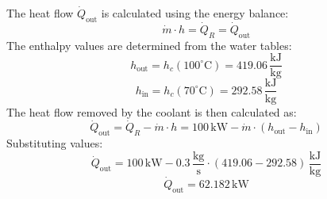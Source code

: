 The heat flow \( \dot{Q}_{\text{out}} \) is calculated using the energy balance:  
\[
\dot{m} \cdot h = \dot{Q}_R = \dot{Q}_{\text{out}}
\]  
The enthalpy values are determined from the water tables:  
\[
h_{\text{out}} = h_c(100^\circ\text{C}) = 419.06 \, \frac{\text{kJ}}{\text{kg}}
\]  
\[
h_{\text{in}} = h_c(70^\circ\text{C}) = 292.58 \, \frac{\text{kJ}}{\text{kg}}
\]  
The heat flow removed by the coolant is then calculated as:  
\[
\dot{Q}_{\text{out}} = \dot{Q}_R - \dot{m} \cdot h = 100 \, \text{kW} - \dot{m} \cdot (h_{\text{out}} - h_{\text{in}})
\]  
Substituting values:  
\[
\dot{Q}_{\text{out}} = 100 \, \text{kW} - 0.3 \, \frac{\text{kg}}{\text{s}} \cdot (419.06 - 292.58) \, \frac{\text{kJ}}{\text{kg}}
\]  
\[
\dot{Q}_{\text{out}} = 62.182 \, \text{kW}
\]